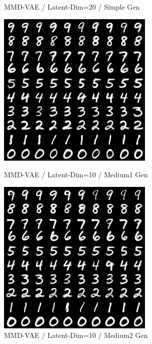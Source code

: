 \documentclass{article}
\begin{document}
\begin{figure}[htb]
  \caption{MMD-VAE / Latent-Dim=20 / Simple Gen}\label{fig:mmd_20_simple}
\endminipage\hfill
{}%
   \includegraphics[width=\linewidth]{assets/mmd_10_medium.png}
  \caption{MMD-VAE / Latent-Dim=10 / Medium1 Gen}\label{fig:mmd_10_medium}
\endminipage\hfill
{}
   \includegraphics[width=\linewidth]{assets/mmd_10_medium2.png}
  \caption{MMD-VAE / Latent-Dim=10 / Medium2 Gen}\label{fig:mmd_20_simple}
\endminipage
\end{figure}
\end{document}
